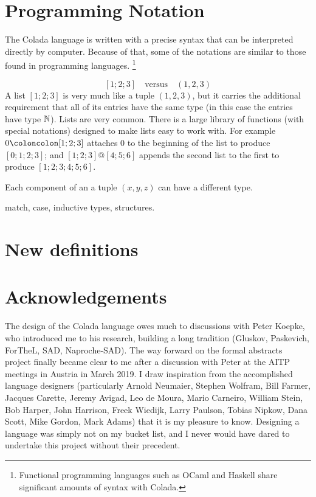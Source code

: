 \documentclass[12pt]{article}
\numberwithin{definition}{section}
\begin{document}
\section{Programming Notation}

The Colada language is written with a precise syntax that can 
be interpreted directly by computer.  Because of that, some of the
notations are similar to those found in programming languages.%
\footnote{Functional programming languages such as OCaml and Haskell
  share significant amounts of syntax with Colada.}

\[
\boxed{[1;2;3]} \quad\text{versus}\quad \boxed{(1,2,3)}
\]
A list $[1;2;3]$ is very much like a tuple $(1,2,3)$, but it
carries the additional requirement that all of its entries have the
same type (in this case the entries have type ${\mathbb N}$).  Lists are very
common.  There is a large library of functions (with special
notations) designed to make lists easy to work with.  For example $0
\coloncolon[1;2;3]$ attaches $0$ to the beginning of the list to
produce $[0;1;2;3]$; and $[1;2;3] @ [4;5;6]$ appends the second list
to the first to produce $[1;2;3;4;5;6]$.

Each component of an a tuple $(x,y,z)$ can have a different type.


match,  case, inductive types, structures.

\section{New definitions}


\section{Acknowledgements}
The design of the Colada language owes much to discussions with Peter
Koepke, who introduced me to his research, building a long tradition
(Gluskov, Paskevich, ForTheL, SAD, Naproche-SAD).  The way forward on
the formal abstracts project finally became clear to me after a
discussion with Peter at the AITP meetings in Austria in March 2019. I
draw inspiration from the accomplished language designers
(particularly Arnold Neumaier, Stephen Wolfram, Bill Farmer, Jacques
Carette, Jeremy Avigad, Leo de Moura, Mario Carneiro, William Stein,
Bob Harper, John Harrison, Freek Wiedijk, Larry Paulson, Tobias
Nipkow, Dana Scott, Mike Gordon, Mark Adams) that it is my pleasure to
know.  Designing a language was simply not on my bucket list, and I
never would have dared to undertake this project without their
precedent.
\end{document}
